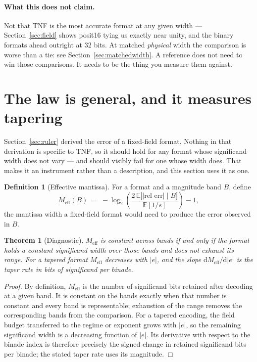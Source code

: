 \documentclass[11pt]{article}
\newtheorem{theorem}{Theorem}
\theoremstyle{definition}
\newtheorem{definition}{Definition}
\begin{document}
\paragraph{What this does not claim.} Not that TNF is the most accurate format
at any given width --- Section~\ref{sec:field} shows posit16 tying us exactly
near unity, and the binary formats ahead outright at 32 bits. At matched
\emph{physical} width the comparison is worse than a tie: see
Section~\ref{sec:matchedwidth}. A reference does not need to win those comparisons. It needs to be the
thing you measure them against.


\section{The law is general, and it measures tapering}\label{sec:law}

Section~\ref{sec:ruler} derived the error of a fixed-field format. Nothing in that
derivation is specific to TNF, so it should hold for any format whose significand
width does not vary --- and should visibly fail for one whose width does. That
makes it an instrument rather than a description, and this section uses it as one.

\begin{definition}[Effective mantissa]
For a format and a magnitude band $B$, define
\[
  M_{\mathrm{eff}}(B) \;=\; -\log_2\!\left(\frac{2\,\mathbb{E}\bigl[|\text{rel err}|\;\big|\;B\bigr]}{\mathbb{E}[1/s]}\right) - 1 ,
\]
the mantissa width a fixed-field format would need to produce the error observed
in $B$.
\end{definition}

\begin{theorem}[Diagnostic]\label{thm:diag}
$M_{\mathrm{eff}}$ is constant across bands if and only if the format holds a
constant significand width over those bands and does not exhaust its range. For a
tapered format $M_{\mathrm{eff}}$ decreases with $|e|$, and the slope
$\mathrm{d}M_{\mathrm{eff}}/\mathrm{d}|e|$ is the taper rate in bits of
significand per binade.
\end{theorem}
\begin{proof}
By definition, $M_{\mathrm{eff}}$ is the number of significand bits retained
after decoding at a given band. It is constant on the bands exactly when that
number is constant and every band is representable; exhaustion of the range
removes the corresponding bands from the comparison. For a tapered encoding,
the field budget transferred to the regime or exponent grows with $|e|$, so the
remaining significand width is a decreasing function of $|e|$. Its derivative
with respect to the binade index is therefore precisely the signed change in
retained significand bits per binade; the stated taper rate uses its magnitude.
\end{proof}
\end{document}
